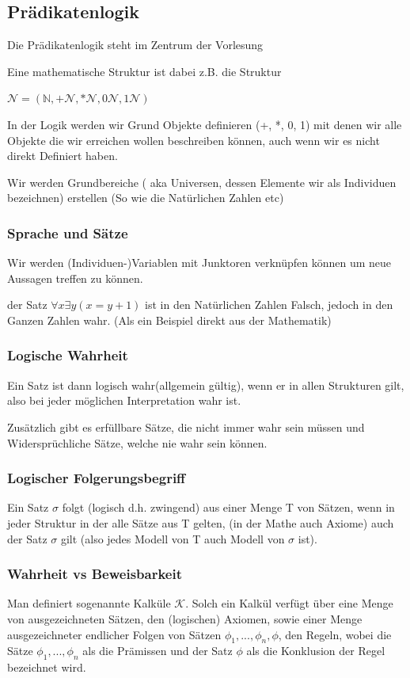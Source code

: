 \documentclass[12pt,a4paper]{article} %
\begin{document}
\subsection{Prädikatenlogik}
Die Prädikatenlogik steht im Zentrum der Vorlesung

Eine mathematische Struktur ist dabei z.B. die Struktur

$\mathcal{N} = ( \mathbb{N} , +\mathcal{N}, * \mathcal{N}, 0\mathcal{N}, 1\mathcal{N})$

In der Logik werden wir Grund Objekte definieren (+, *, 0, 1) mit denen wir alle Objekte die wir erreichen wollen beschreiben können, auch wenn wir es nicht direkt Definiert haben.

Wir werden Grundbereiche ( aka Universen, dessen Elemente wir als Individuen bezeichnen) erstellen (So wie die Natürlichen Zahlen etc)

\subsubsection{Sprache und Sätze}
Wir werden (Individuen-)Variablen mit Junktoren verknüpfen können um neue Aussagen treffen zu können.

der Satz $\forall x\exists y(x = y + 1)$ ist in den Natürlichen Zahlen Falsch, jedoch in den Ganzen Zahlen wahr. (Als ein Beispiel direkt aus der Mathematik)

\subsubsection{Logische Wahrheit}
Ein Satz ist dann logisch wahr(allgemein gültig), wenn er in allen Strukturen gilt, also bei jeder möglichen Interpretation wahr ist.

Zusätzlich gibt es erfüllbare Sätze, die nicht immer wahr sein müssen und Widersprüchliche Sätze, welche nie wahr sein können.

\subsubsection{Logischer Folgerungsbegriff}
Ein Satz $\sigma$ folgt (logisch d.h. zwingend) aus einer Menge T von Sätzen, wenn in jeder Struktur in der alle Sätze aus T gelten, (in der Mathe auch Axiome) auch der Satz $\sigma$ gilt (also jedes Modell von T auch Modell von $\sigma$ ist).

\subsubsection{Wahrheit vs Beweisbarkeit}
Man definiert sogenannte Kalküle $\mathcal{K}$. Solch ein Kalkül verfügt über eine Menge von ausgezeichneten Sätzen, den (logischen) Axiomen, sowie einer Menge ausgezeichneter endlicher Folgen von Sätzen $\phi_1, ..., \phi_n, \phi$, den Regeln, wobei die Sätze  $\phi_1, ..., \phi_n$ als die Prämissen und der Satz $\phi$ als die Konklusion der Regel bezeichnet wird.
\end{document}
